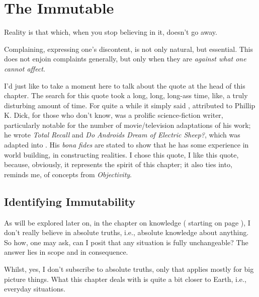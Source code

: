 \documentclass[../butidigress.tex]{subfiles}
\begin{document}
\chapter{The Immutable}\label{chap:immutable}
\epigraph{Reality is that which, when you stop believing in it, doesn't go away.}{}
\newpage
{}
Complaining, expressing one's discontent, is not only natural, but essential.
This does not enjoin complaints generally, but only when they are \emph{against what one cannot affect}.

I'd just like to take a moment here to talk about the quote at the head of this chapter.
The search for this quote took a long, long, long-ass time, like, a truly disturbing amount of time.
For quite a while it simply said , attributed to 
Phillip K. Dick, for those who don't know, was a prolific science-fiction writer, particularly notable for the number of movie/television adaptations of his work; he wrote \textit{Total Recall} and \textit{Do Androids Dream of Electric Sheep?}, which was adapted into .
His \textit{bona fides} are stated to show that he has some experience in world building, in constructing realities.
I chose this quote, I like this quote, because, obviously, it represents the spirit of this chapter; it also ties into, reminds me, of concepts from \textit{Objectivity}.

\section{Identifying Immutability}
As will be explored later on, in the chapter on knowledge ( starting on page \pageref{chap:knowledge}), I don't really believe in absolute truths, i.e., absolute knowledge about anything.
So how, one may ask, can I posit that any situation is fully unchangeable?
The answer lies in scope and in consequence.

Whilst, yes, I don't subscribe to absolute truths, only  that applies mostly for big picture things.
What this chapter deals with is quite a bit closer to Earth, i.e., everyday situations.
\end{document}
